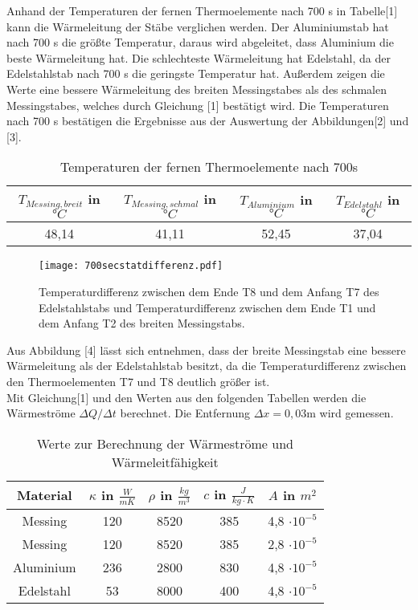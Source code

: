 Anhand der Temperaturen der fernen Thermoelemente nach 700 s in Tabelle[1] kann die Wärmeleitung der Stäbe verglichen werden.
Der Aluminiumstab hat nach 700 s die größte Temperatur, daraus wird abgeleitet, dass Aluminium die beste Wärmeleitung hat. Die schlechteste
Wärmeleitung hat Edelstahl, da der Edelstahlstab nach 700 s die geringste Temperatur hat.
Außerdem zeigen die Werte eine bessere Wärmeleitung des breiten Messingstabes als des schmalen Messingstabes, welches durch Gleichung [1] bestätigt wird.
Die Temperaturen nach 700 s bestätigen die Ergebnisse aus der Auswertung der Abbildungen[2] und [3].
\begin{table}[H]
  \centering
  \caption{Temperaturen der fernen Thermoelemente nach 700s}
  \label{tab:1}
  \begin{tabular}{c c c c}
    \toprule
    $T_{Messing,breit}$ in $°C$ &   $T_{Messing,schmal}$ in $°C$ &  $T_{Aluminium}$ in $°C$ &  $T_{Edelstahl}$ in $°C$ \\
    \midrule
    48,14 & 41,11 & 52,45 & 37,04\\
    \bottomrule
  \end{tabular}
\end{table}  
\begin{figure}[H]
  \centering
  \texttt{[image: 700secstatdifferenz.pdf]}
  \caption{Temperaturdifferenz zwischen dem Ende T8 und dem Anfang T7 des Edelstahlstabs und Temperaturdifferenz zwischen dem Ende T1 und dem Anfang T2 des breiten Messingstabs.}
  \label{fig:4}
\end{figure}
Aus Abbildung [4] lässt sich entnehmen, dass der breite Messingstab eine bessere Wärmeleitung als der Edelstahlstab besitzt, da die Temperaturdifferenz
zwischen den Thermoelementen T7 und T8 deutlich größer ist. \\
Mit Gleichung[1] und den Werten aus den folgenden Tabellen werden die Wärmeströme $\Delta Q / \Delta t$ berechnet.
Die Entfernung $\Delta x = 0,03 \text{m}$ wird gemessen.
\begin{table}[H]
  \centering
  \caption{Werte zur Berechnung der Wärmeströme und Wärmeleitfähigkeit}
  \label{tab:2}
  \begin{tabular}{c c c c c}
  \toprule
  Material & $\kappa $ in $\frac{W}{mK}$ & $\rho$ in $\frac{kg}{m^3}$ & $c$ in $\frac{J}{kg\cdot K}$ & $A$ in $m^2$\\
  \midrule
    Messing & 120 & 8520 & 385 & 4,8 $\cdot 10^{-5}$ \\
    Messing & 120 & 8520 & 385 & 2,8 $\cdot 10^{-5}$ \\
    Aluminium & 236 & 2800 & 830 & 4,8 $\cdot 10^{-5}$ \\
    Edelstahl & 53 & 8000 & 400 & 4,8 $\cdot 10^{-5}$ \\
  \bottomrule
\end{tabular}
\end{table}
